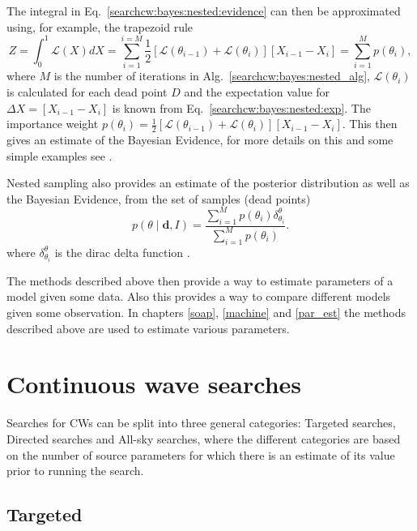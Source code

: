 The integral in Eq.~\ref{searchcw:bayes:nested:evidence} can then be approximated using, for example, the trapezoid rule
\begin{equation}
	Z = \int_0^1 \mathcal{L}(X) dX = \sum_{i=1}^{i=M} \frac{1}{2} \left[ \mathcal{L}(\theta_{i-1}) + \mathcal{L}(\theta_i)\right] \left[ X_{i-1} - X_{i} \right] = \sum_{i=1}^{M} p(\theta_i),
\end{equation}
where $M$ is the number of iterations in Alg.~\ref{searchcw:bayes:nested_alg}, $\mathcal{L}(\theta_i)$ is calculated for each dead point $D$ and the expectation value for $\Delta X = \left[ X_{i-1} - X_{i} \right]$ is known from Eq.~\ref{searchcw:bayes:nested:exp}. The importance weight $p(\theta_i) = \frac{1}{2} \left[ \mathcal{L}(\theta_{i-1}) + \mathcal{L}(\theta_i)\right] \left[ X_{i-1} - X_{i} \right]$.
This then gives an estimate of the Bayesian Evidence, for more details on this and some simple examples see \citep{skilling2006NestedSampling}.

Nested sampling also provides an estimate of the posterior distribution as well as the Bayesian Evidence, from the set of samples (dead points) 
\begin{equation}
	p(\theta \mid \bm{d}, I) = \frac{\sum_{i=1}^{M} p(\theta_i) \delta^{\theta}_{\theta_i}}{\sum_{i=1}^{M} p(\theta_i) }.
\end{equation}
where $\delta^{\theta}_{\theta_i}$ is the dirac delta function \citep{speagle2019DynestyDynamic}.


The methods described above then provide a way to estimate parameters of a
model given some data.  Also this provides a way to compare different models
given some observation.  In chapters \ref{soap}, \ref{machine} and \ref{par_est} the methods
described above are used to estimate various parameters.

\clearpage
\section{\label{searchcw:search} Continuous wave searches}

Searches for \glspl{CW} can be split into three general categories: Targeted
searches, Directed searches and All-sky searches, where the different
categories are based on the number of source parameters for which there is an estimate of its value prior to running the search.

\subsection{\label{searchcw:search:targeted}Targeted}

